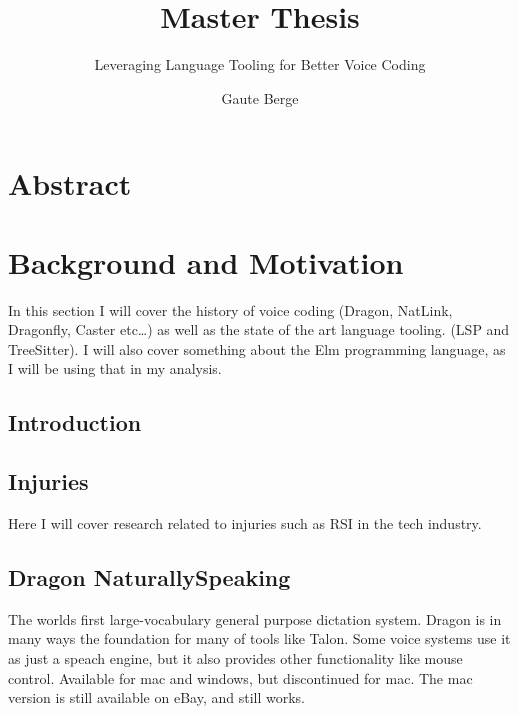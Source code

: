 \documentclass[a4paper,english]{ifimaster}
\title{Master Thesis}
\subtitle{Leveraging Language Tooling for Better Voice Coding}
\author{Gaute Berge}
\begin{document}
\duoforside[dept={Department of Informatics},
program={Informatics: Programming and System Architecture},
long]

\frontmatter{}
\chapter*{Abstract}

\tableofcontents{}
\listoffigures{}
\listoftables{}


\mainmatter{}
\chapter{Background and Motivation}

In this section I will cover the history of voice coding (Dragon, NatLink, Dragonfly, Caster etc\ldots)
as well as the state of the art language tooling. (LSP and TreeSitter).
I will also cover something about the Elm programming language, as I will be using that in my analysis.



\section{Introduction}

\section{Injuries}
Here I will cover research related to injuries such as RSI in the tech industry.

\section{Dragon NaturallySpeaking}
The worlds first large-vocabulary general purpose dictation system.
Dragon is in many ways the foundation for many of tools like Talon.
Some voice systems use it as just a speach engine, but it also provides other functionality like mouse control.
Available for mac and windows, but discontinued for mac.%
The mac version is still available on eBay, and still works. %
\end{document}
